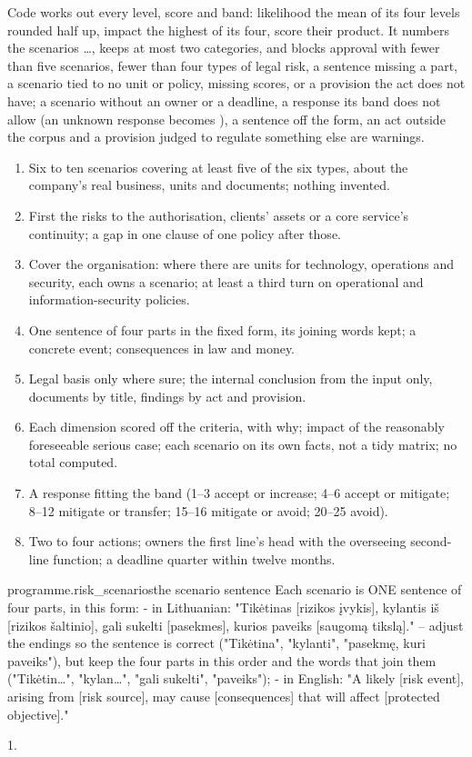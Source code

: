 Code works out every level, score and band: likelihood the mean of its four levels rounded
half up, impact the highest of its four, score their product. It numbers the scenarios
 …, keeps at most two categories, and blocks approval with fewer than five
scenarios, fewer than four types of legal risk, a sentence missing a part, a scenario tied to
no unit or policy, missing scores, or a provision the act does not have; a scenario without
an owner or a deadline, a response its band does not allow (an unknown response becomes
), a sentence off the form, an act outside the corpus and a provision judged to
regulate something else are warnings.

\begin{enumerate}[itemsep=1pt, topsep=3pt]
  \item Six to ten scenarios covering at least five of the six types, about the company's real
    business, units and documents; nothing invented.
  \item First the risks to the authorisation, clients' assets or a core service's continuity;
    a gap in one clause of one policy after those.
  \item Cover the organisation: where there are units for technology, operations and security, each owns a
    scenario; at least a third turn on operational and information-security policies.
  \item One sentence of four parts in the fixed form, its joining words kept; a concrete event;
    consequences in law and money.
  \item Legal basis only where sure; the internal conclusion from the input only, documents by
    title, findings by act and provision.
  \item Each dimension scored off the criteria, with why; impact of the reasonably foreseeable
    serious case; each scenario on its own facts, not a tidy matrix; no total computed.
  \item A response fitting the band (1--3 accept or increase; 4--6 accept or mitigate; 8--12
    mitigate or transfer; 15--16 mitigate or avoid; 20--25 avoid).
  \item Two to four actions; owners the first line's head with the overseeing second-line
    function; a deadline quarter within twelve months.
\end{enumerate}

\par\nopagebreak
\begin{promptexcerpt}{programme.risk_scenarios}{the scenario sentence}
Each scenario is ONE sentence of four parts, in this form:
- in Lithuanian: "Tikėtinas [rizikos įvykis], kylantis iš [rizikos šaltinio], gali sukelti [pasekmes], kurios paveiks [saugomą tikslą]." – adjust the endings so the sentence is correct ("Tikėtina", "kylanti", "pasekmę, kuri paveiks"), but keep the four parts in this order and the words that join them ("Tikėtin…", "kylan…", "gali sukelti", "paveiks");
- in English: "A likely [risk event], arising from [risk source], may cause [consequences] that will affect [protected objective]."
\end{promptexcerpt}

 1.
